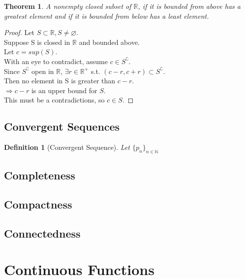 \documentclass{article}
\newtheorem{definition}{Definition}[section]
\newtheorem{theorem}{Theorem}[section]
\begin{document}
			\begin{theorem}
				A nonempty closed subset of $\mathbb{R}$, if it is bounded from above has a greatest element
				and if it is bounded from below has a least element.
			\end{theorem}
			\begin{proof}
				Let $S \subset \mathbb{R}, S \neq \varnothing$. \\
				Suppose S is closed in $\mathbb{R}$ and bounded above. \\
				Let $c = sup(S)$. \\
				With an eye to contradict, assume $c \in S^\complement$. \\
				Since $S^\complement$ open in $\mathbb{R}$, $\exists r \in \mathbb{R}^+$ s.t. $(c-r, c+r) \subset S^\complement$. \\
				Then no element in S is greater than $c - r$. \\
				$\Rightarrow c - r$ is an upper bound for $S$. \\
				This must be a contradictions, so $c \in S$.
			\end{proof}

		\subsection{Convergent Sequences}

			\begin{definition}[Convergent Sequence]
				\label{convergent sequence}
				Let $\{ p_n \}_{n \in \mathbb{N}}$
				
			\end{definition}
		
		\subsection{Completeness}
		
		\subsection{Compactness}
		
		\subsection{Connectedness}
	
	\section{Continuous Functions}
\end{document}
